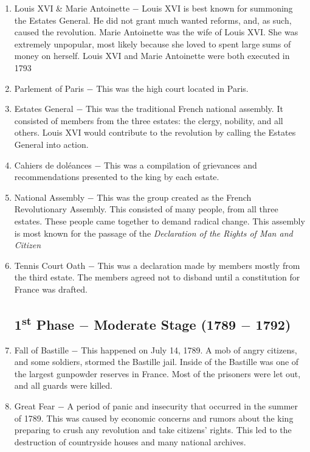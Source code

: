 \documentclass[12pt]{article}
\begin{document}
\begin{enumerate}
\item Louis XVI \& Marie Antoinette $-$ Louis XVI is best known for summoning the Estates General. He did not grant much wanted reforms, and, as such, caused the revolution. Marie Antoinette was the wife of Louis XVI. She was extremely unpopular, most likely because she loved to spent large sums of money on herself. Louis XVI and Marie Antoinette were both executed in 1793

\item Parlement of Paris $-$ This was the high court located in Paris.

\item Estates General $-$ This was the traditional French national assembly. It consisted of members from the three estates: the clergy, nobility, and all others. Louis XVI would contribute to the revolution by calling the Estates General into action.

\item Cahiers de dol\'eances $-$ This was a compilation of grievances and recommendations presented to the king by each estate.

\item National Assembly $-$ This was the group created as the French Revolutionary Assembly. This consisted of many people, from all three estates. These people came together to demand radical change. This assembly is most known for the passage of the \textit{Declaration of the Rights of Man and Citizen}

\item Tennis Court Oath $-$ This was a declaration made by members mostly from the third estate. The members agreed not to disband until a constitution for France was drafted.

\subsection{1\textsuperscript{st} Phase $-$ Moderate Stage (1789 $-$ 1792)}

\item Fall of Bastille $-$ This happened on July 14, 1789. A mob of angry citizens, and some soldiers, stormed the Bastille jail. Inside of the Bastille was one of the largest gunpowder reserves in France. Most of the prisoners were let out, and all guards were killed.

\item Great Fear $-$ A period of panic and insecurity that occurred in the summer of 1789. This was caused by economic concerns and rumors about the king preparing to crush any revolution and take citizens' rights. This led to the destruction of countryside houses and many national archives.


\end{enumerate}
\end{document}
